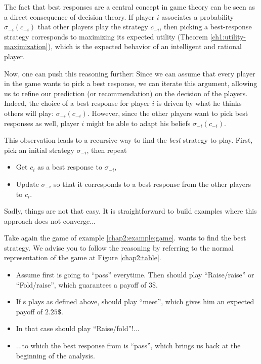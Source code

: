 The fact that best responses are a central concept in game theory can be seen as a direct consequence of decision theory. If player $i$ associates a probability $\sigma_{-i}(c_{-i}) $ that other players play the strategy $c_{-i}$, then picking a best-response strategy corresponds to maximizing its expected utility (Theorem \ref{ch1:utility-maximization}), which is the expected behavior of an intelligent and rational player.

Now, one can push this reasoning further: Since we can assume that every player in the game wants to pick a best response, we can iterate this argument, allowing us to refine our prediction (or recommendation) on the decision of the players.
Indeed, the choice of a best response for player $i$ is driven by what he thinks others will play: $\sigma_{-i}(c_{-i}) $. However, since the other players want to pick best responses as well, player $i$ might be able to adapt his beliefs $\sigma_{-i}(c_{-i}) $.

This observation leads to a recursive way to  find the \emph{best} strategy to play. First, pick an initial strategy $\sigma_{-i}$,  then repeat
\begin{itemize}
 \item Get $c_i$ as a best response to $\sigma_{-i}$,
 \item Update $\sigma_{-i}$ so that it corresponds to a best response from the other players to $c_i$.
\end{itemize}

Sadly, things are not that easy. It is straightforward to build examples where this approach does not converge...

\begin{example}
Take again the game of example \ref{chap2:example:game}. \TAtwo{} wants to find the best strategy. We advise you to follow the reasoning by referring to the normal representation of the game at Figure \ref{chap2:table}.

\begin{itemize}
\item Assume first \TAone{} is going to ``pass'' everytime. Then \TAtwo{} should play ``Raise/raise'' or ``Fold/raise'', which guarantees a payoff of $3\$$.
\item If \TAtwo{}s plays as defined above, \TAone{} should play ``meet'', which gives him an expected payoff of $2.25\$$.
\item In that case \TAtwo{} should play ``Raise/fold''!...
\item ...to which the best response from \TAone{} is ``pass'', which brings us back at the beginning of the analysis.
\end{itemize}
\label{chap2:example:bestresponseequilibria}
\end{example}

